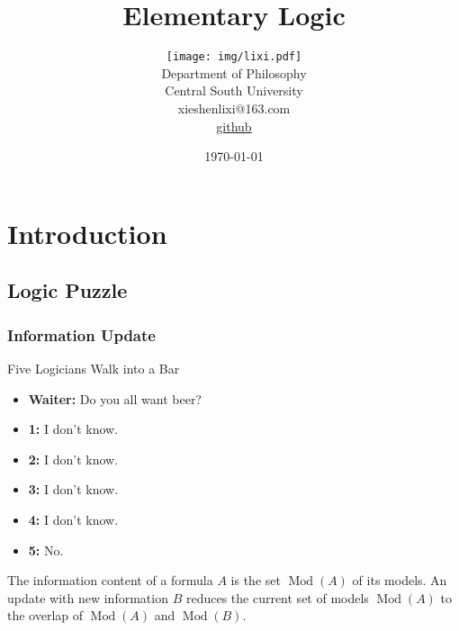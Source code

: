 \documentclass[UTF8,aspectratio=43,11pt,colorlinks,compress,openany]{beamer}%
\begin{document}
\title{Elementary Logic}
\author{
	{\texttt{[image: img/lixi.pdf]}}\\
	\small Department of Philosophy\\
	\footnotesize Central South University\\
	\scriptsize xieshenlixi@163.com\\
	\scriptsize \href{https://github.com/rickylixi/logic}{github}
}
\date{\today}
\maketitle





\section{Introduction}

\subsection{Logic Puzzle}

\begin{frame}\frametitle{Information Update}
\begin{block}{Five Logicians Walk into a Bar}
	\begin{itemize}
		\item \textbf{Waiter:} Do you all want beer?
		\item \textbf{1:} I don't know.
		\item \textbf{2:} I don't know.
		\item \textbf{3:} I don't know.
		\item \textbf{4:} I don't know.
		\item \textbf{5:} No.
	\end{itemize}	
\end{block}
The information content of a formula $A$ is the set $\operatorname{Mod}(A)$ of its models. An update with new information $B$ reduces the current set of models $\operatorname{Mod}(A)$ to the overlap of $\operatorname{Mod}(A)$ and $\operatorname{Mod}(B)$.
\end{frame}
\end{document}
